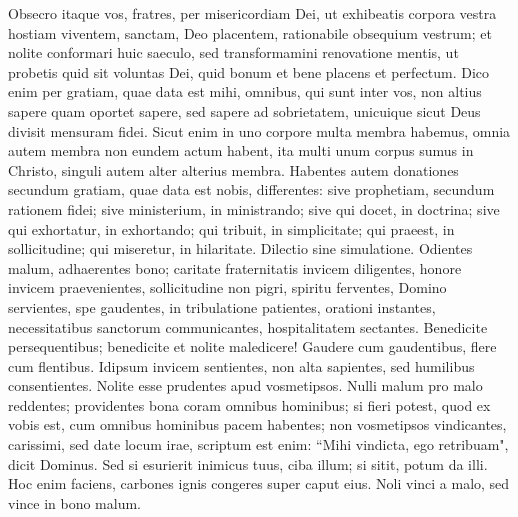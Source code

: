 \begin{biblechapter}  
\verse Obsecro itaque vos, fratres, per misericordiam Dei, ut exhibeatis corpora vestra hostiam viventem, sanctam, Deo placentem, rationabile obsequium vestrum;  
\verse et nolite conformari huic saeculo, sed transformamini renovatione mentis, ut probetis quid sit voluntas Dei, quid bonum et bene placens et perfectum. 
\verse Dico enim per gratiam, quae data est mihi, omnibus, qui sunt inter vos, non altius sapere quam oportet sapere, sed sapere ad sobrietatem, unicuique sicut Deus divisit mensuram fidei. 
\verse Sicut enim in uno corpore multa membra habemus, omnia autem membra non eundem actum habent, 
\verse ita multi unum corpus sumus in Christo, singuli autem alter alterius membra. 
\verse Habentes autem donationes secundum gratiam, quae data est nobis, differentes: sive prophetiam, secundum rationem fidei; 
\verse sive ministerium, in ministrando; sive qui docet, in doctrina; 
\verse sive qui exhortatur, in exhortando; qui tribuit, in simplicitate; qui praeest, in sollicitudine; qui miseretur, in hilaritate. 
\verse Dilectio sine simulatione. Odientes malum, adhaerentes bono; 
\verse caritate fraternitatis invicem diligentes, honore invicem praevenientes, 
\verse sollicitudine non pigri, spiritu ferventes, Domino servientes, 
\verse spe gaudentes, in tribulatione patientes, orationi instantes, 
\verse necessitatibus sanctorum communicantes, hospitalitatem sectantes. 
\verse Benedicite persequentibus; benedicite et nolite maledicere! 
\verse Gaudere cum gaudentibus, flere cum flentibus. 
\verse Idipsum invicem sentientes, non alta sapientes, sed humilibus consentientes. Nolite esse prudentes apud vosmetipsos. 
\verse Nulli malum pro malo reddentes; providentes bona coram omnibus hominibus;  
\verse si fieri potest, quod ex vobis est, cum omnibus hominibus pacem habentes;  
\verse non vosmetipsos vindicantes, carissimi, sed date locum irae, scriptum est enim: “Mihi vindicta, ego retribuam", dicit Dominus. 
\verse Sed si esurierit inimicus tuus, ciba illum; si sitit, potum da illi. Hoc enim faciens, carbones ignis congeres super caput eius. 
\verse Noli vinci a malo, sed vince in bono malum. 
\end{biblechapter}

